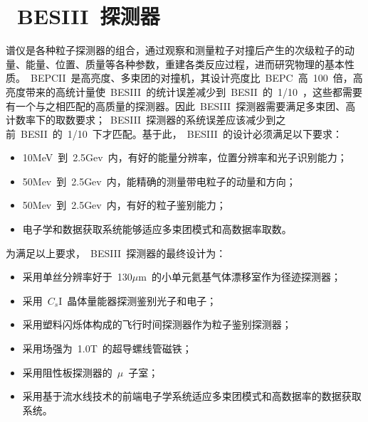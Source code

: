 \section{~BESIII~探测器}
谱仪是各种粒子探测器的组合，通过观察和测量粒子对撞后产生的次级粒子的动量、能量、位置、质量等各种参数，重建各类反应过程，进而研究物理的基本性质。~BEPCII~是高亮度、多束团的对撞机，其设计亮度比~BEPC~高~100~倍，高亮度带来的高统计量使~BESIII~的统计误差减少到~BESII~的~1/10~，这些都需要有一个与之相匹配的高质量的探测器。因此~BESIII~探测器需要满足多束团、高计数率下的取数要求；~BESIII~探测器的系统误差应该减少到之前~BESII~的~1/10~下才匹配。基于此，~BESIII~的设计必须满足以下要求：
\begin{itemize}
\item{10MeV~到~2.5Gev~内，有好的能量分辨率，位置分辨率和光子识别能力；}
\item{50Mev~到~2.5Gev~内，能精确的测量带电粒子的动量和方向；}
\item{50Mev~到~2.5Gev~内，有好的粒子鉴别能力；}
\item{电子学和数据获取系统能够适应多束团模式和高数据率取数。}
\end{itemize}

为满足以上要求，~BESIII~探测器的最终设计为：
\begin{itemize}
\item{采用单丝分辨率好于~130$\mu$m~的小单元氦基气体漂移室作为径迹探测器；}
\item{采用~$C_{s}$I~晶体量能器探测鉴别光子和电子；}
\item{采用塑料闪烁体构成的飞行时间探测器作为粒子鉴别探测器；}
\item{采用场强为~1.0T~的超导螺线管磁铁；}
\item{采用阻性板探测器的~$\mu$~子室；}
\item{采用基于流水线技术的前端电子学系统适应多束团模式和高数据率的数据获取系统。}
\end{itemize}

